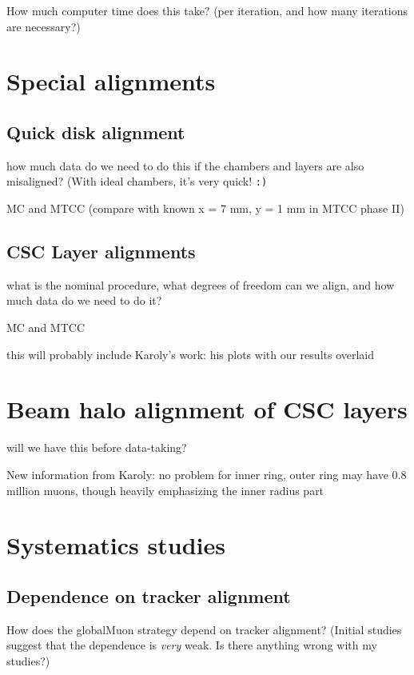 \documentclass[12pt]{article}
\begin{document}
How much computer time does this take?  (per iteration, and how
many iterations are necessary?)

\section{Special alignments}

\subsection{Quick disk alignment}

how much data do we need to do this if the
chambers and layers are also misaligned?  (With ideal chambers,
it's very quick! {\tt :)}

MC and MTCC (compare with known x = 7 mm, y = 1 mm in MTCC phase II)

\subsection{CSC Layer alignments}

what is the nominal procedure, what degrees
of freedom can we align, and how much data do we need to do it?

MC and MTCC

this will probably include Karoly's work: his plots with our results overlaid

\section{Beam halo alignment of CSC layers}

will we have this before data-taking?

New information from Karoly: no problem for inner ring, outer ring may
have 0.8 million muons, though heavily emphasizing the inner radius part

\section{Systematics studies}

\subsection{Dependence on tracker alignment}

How does the globalMuon strategy depend on tracker alignment?
(Initial studies suggest that the dependence is {\it very} weak.  Is
there anything wrong with my studies?)
\end{document}

